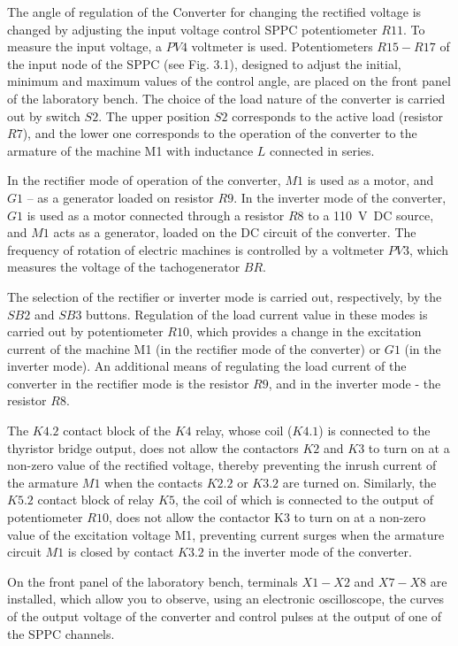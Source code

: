 \documentclass[a4paper,14pt]{article}
\begin{document}
The angle of regulation of the Converter for changing the rectified voltage is changed by adjusting the input voltage control SPPC potentiometer $R11$. To measure the input voltage, a $PV4$ voltmeter is used. Potentiometers $R15-R17$ of the input node of the SPPC (see Fig. 3.1), designed to adjust the initial, minimum and maximum values of the control angle, are placed on the front panel of the laboratory bench.
The choice of the load nature of the converter is carried out by switch $S2$. The upper position $S2$ corresponds to the active load (resistor $R7$), and the lower one corresponds to the operation of the converter to the armature of the machine M1 with inductance $L$ connected in series.

In the rectifier mode of operation of the converter, $M1$ is used as a motor, and $G1$ -- as a generator loaded on resistor $R9$. 
In the inverter mode of the converter, $G1$ is used as a motor connected through a resistor $R8$ to a 110~V~DC source, and $M1$ acts as a generator, loaded on the DC circuit of the converter. 
The frequency of rotation of electric machines is controlled by a voltmeter $PV3$, which measures the voltage of the tachogenerator $BR$.

The selection of the rectifier or inverter mode is carried out, respectively, by the $SB2$ and $SB3$ buttons. Regulation of the load current value in these modes is carried out by potentiometer $R10$, which provides a change in the excitation current of the machine M1 (in the rectifier mode of the converter) or $G1$ (in the inverter mode). An additional means of regulating the load current of the converter in the rectifier mode is the resistor $R9$, and in the inverter mode - the resistor $R8$.

The $K4.2$ contact block of the $K4$ relay, whose coil ($K4.1$) is connected to the thyristor bridge output, does not allow the contactors $K2$ and $K3$ to turn on at a non-zero value of the rectified voltage, thereby preventing the inrush current of the armature $M1$ when the contacts $K2.2$ or $K3.2$ are turned on. 
Similarly, the $K5.2$ contact block of relay $K5$, the coil of which is connected to the output of potentiometer $R10$, does not allow the contactor K3 to turn on at a non-zero value of the excitation voltage M1, preventing current surges when the armature circuit $M1$ is closed by contact $K3.2$ in the inverter mode of the converter.

On the front panel of the laboratory bench, terminals $X1-X2$ and $X7-X8$ are installed, which allow you to observe, using an electronic oscilloscope, the curves of the output voltage of the converter and control pulses at the output of one of the SPPC channels.
\end{document}
